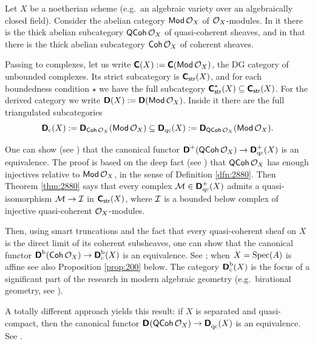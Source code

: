 \begin{exa}
Let $X$ be a noetherian scheme (e.g.\ an algebraic variety over an 
algebraically closed field). Consider the abelian category 
$\operatorname{\mathsf{Mod}} \mathcal{O}_X$ of $\mathcal{O}_X$-modules. In it there is the thick abelian
subcategory $\operatorname{\mathsf{QCoh}} \mathcal{O}_X$ of quasi-coherent sheaves, and in 
that there is the thick abelian
subcategory $\operatorname{\mathsf{Coh}} \mathcal{O}_X$ of coherent sheaves.

Passing to complexes, let us write 
$\boldsymbol{\mathsf{C}}(X) := \boldsymbol{\mathsf{C}}(\operatorname{\mathsf{Mod}} \mathcal{O}_X)$,
the DG category of unbounded complexes. Its strict subcategory is 
$\boldsymbol{\mathsf{C}}_{\operatorname{\mathsf{str}}}(X)$, and for each boundedness condition $\star$ we have 
the full subcategory 
$\boldsymbol{\mathsf{C}}^{\star}_{\operatorname{\mathsf{str}}}(X) \subseteq \boldsymbol{\mathsf{C}}_{\operatorname{\mathsf{str}}}(X)$. 
For the derived category we write 
$\boldsymbol{\mathsf{D}}(X) := \boldsymbol{\mathsf{D}}(\operatorname{\mathsf{Mod}} \mathcal{O}_X)$.
Inside it there are the full triangulated subcategories
\[ \boldsymbol{\mathsf{D}}_{\mathrm{c}}(X) := 
\boldsymbol{\mathsf{D}}_{\operatorname{\mathsf{Coh}} \mathcal{O}_X}(\operatorname{\mathsf{Mod}} \mathcal{O}_X) \subseteq
\boldsymbol{\mathsf{D}}_{\mathrm{qc}}(X) := 
\boldsymbol{\mathsf{D}}_{\operatorname{\mathsf{QCoh}} \mathcal{O}_X}(\operatorname{\mathsf{Mod}} \mathcal{O}_X) . \]

One can show (see \cite[Corollary II.7.19]{RD}) that the canonical functor \lb
$\boldsymbol{\mathsf{D}}^{+}(\operatorname{\mathsf{QCoh}} \mathcal{O}_X) \to \boldsymbol{\mathsf{D}}^{+}_{\mathrm{qc}}(X)$
is an equivalence. The proof is based on the deep fact 
(see \cite[Theorem II.7.18]{RD}) 
that $\operatorname{\mathsf{QCoh}} \mathcal{O}_X$ has enough injectives relative to 
$\operatorname{\mathsf{Mod}} \mathcal{O}_X$, in the sense of Definition \ref{dfn:2880}. 
Then Theorem \ref{thm:2880} says that every complex 
$\mathcal{M} \in \boldsymbol{\mathsf{D}}^{+}_{\mathrm{qc}}(X)$ admits a quasi-isomorphism 
$\mathcal{M} \to \mathcal{I}$ in $\boldsymbol{\mathsf{C}}_{\operatorname{\mathsf{str}}}(X)$, where $\mathcal{I}$ is a bounded below 
complex of injective quasi-coherent $\mathcal{O}_X$-modules. 

Then, using smart truncations and the fact that every 
quasi-coherent sheaf on $X$ is the direct limit of its coherent subsheaves, one 
can show that the canonical functor 
$\boldsymbol{\mathsf{D}}^{\mathrm{b}}(\operatorname{\mathsf{Coh}} \mathcal{O}_X) \to \boldsymbol{\mathsf{D}}^{\mathrm{b}}_{\mathrm{c}}(X)$
is an equivalence. See \cite[Proposition 3.5]{Huy}; when $X = 
\operatorname{Spec}(A)$ is affine see also Proposition \ref{prop:200} below. The 
category 
$\boldsymbol{\mathsf{D}}^{\mathrm{b}}_{\mathrm{c}}(X)$
is the focus of a significant part of the research in modern algebraic geometry 
(e.g.\ birational geometry, see \cite{Huy}). 

A totally different approach yields this result: if $X$ is separated and 
quasi-compact, then the canonical functor
$\boldsymbol{\mathsf{D}}^{}(\operatorname{\mathsf{QCoh}} \mathcal{O}_X) \to \boldsymbol{\mathsf{D}}^{}_{\mathrm{qc}}(X)$
is an equivalence. See \cite[Corollary 5.5]{BoNe}.
\end{exa}

